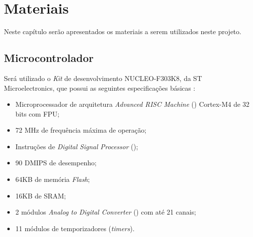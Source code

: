 
\chapter{Materiais} \label{cap:materiais}
\vspace{-2cm}
Neste capítulo serão apresentados os materiais a serem utilizados neste projeto.\newline

\section{Microcontrolador} \label{cap:micro}

Será utilizado o \textit{Kit} de desenvolvimento NUCLEO-F303K8, da ST Microelectronics, %
que possui as seguintes especificações básicas \cite{stm303}:

\begin{itemize}
 \item Microprocessador de arquitetura \textit{Advanced RISC Machine} () Cortex-M4 de 32 bits com FPU;
 \item 72 MHz de frequência máxima de operação;
 \item Instruções de \textit{Digital Signal Processor} ();
 \item 90 DMIPS de desempenho;
 \item 64KB de memória \textit{Flash};
 \item 16KB de SRAM;
 \item 2 módulos \textit{Analog to Digital Converter} () com até 21 canais;
 \item 11 módulos de temporizadores (\textit{timers}).
\end{itemize}%
\vspace{0.5cm}

